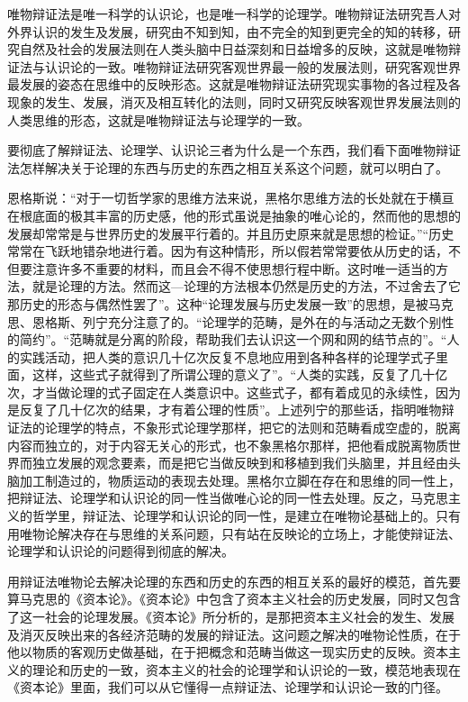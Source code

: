 唯物辩证法是唯一科学的认识论，也是唯一科学的论理学。唯物辩证法研究吾人对外界认识的发生及发展，研究由不知到知，由不完全的知到更完全的知的转移，研究自然及社会的发展法则在人类头脑中日益深刻和日益增多的反映，这就是唯物辩证法与认识论的一致。唯物辩证法研究客观世界最一般的发展法则，研究客观世界最发展的姿态在思维中的反映形态。这就是唯物辩证法研究现实事物的各过程及各现象的发生、发展，消灭及相互转化的法则，同时又研究反映客观世界发展法则的人类思维的形态，这就是唯物辩证法与论理学的一致。

要彻底了解辩证法、论理学、认识论三者为什么是一个东西，我们看下面唯物辩证法怎样解决关于论理的东西与历史的东西之相互关系这个问题，就可以明白了。

恩格斯说：“对于一切哲学家的思维方法来说，黑格尔思维方法的长处就在于横亘在根底面的极其丰富的历史感，他的形式虽说是抽象的唯心论的，然而他的思想的发展却常常是与世界历史的发展平行着的。并且历史原来就是思想的检证。”“历史常常在飞跃地错杂地进行着。因为有这种情形，所以假若常常要依从历史的话，不但要注意许多不重要的材料，而且会不得不使思想行程中断。这时唯一适当的方法，就是论理的方法。然而这—论理的方法根本仍然是历史的方法，不过舍去了它那历史的形态与偶然性罢了”。这种“论理发展与历史发展一致”的思想，是被马克思、恩格斯、列宁充分注意了的。“论理学的范畴，是外在的与活动之无数个别性的简约”。“范畴就是分离的阶段，帮助我们去认识这一个网和网的结节点的”。“人的实践活动，把人类的意识几十亿次反复不息地应用到各种各样的论理学式子里面，这样，这些式子就得到了所谓公理的意义了”。“人类的实践，反复了几十亿次，才当做论理的式子固定在人类意识中。这些式子，都有着成见的永续性，因为是反复了几十亿次的结果，才有着公理的性质”。上述列宁的那些话，指明唯物辩证法的论理学的特点，不象形式论理学那样，把它的法则和范畴看成空虚的，脱离内容而独立的，对于内容无关心的形式，也不象黑格尔那样，把他看成脱离物质世界而独立发展的观念要素，而是把它当做反映到和移植到我们头脑里，并且经由头脑加工制造过的，物质运动的表现去处理。黑格尔立脚在存在和思维的同一性上，把辩证法、论理学和认识论的同一性当做唯心论的同一性去处理。反之，马克思主义的哲学里，辩证法、论理学和认识论的同一性，是建立在唯物论基础上的。只有用唯物论解决存在与思维的关系问题，只有站在反映论的立场上，才能使辩证法、论理学和认识论的问题得到彻底的解决。

用辩证法唯物论去解决论理的东西和历史的东西的相互关系的最好的模范，首先要算马克思的《资本论》。《资本论》中包含了资本主义社会的历史发展，同时又包含了这一社会的论理发展。《资本论》所分析的，是那把资本主义社会的发生、发展及消灭反映出来的各经济范畴的发展的辩证法。这问题之解决的唯物论性质，在于他以物质的客观历史做基础，在于把概念和范畴当做这一现实历史的反映。资本主义的理论和历史的一致，资本主义的社会的论理学和认识论的一致，模范地表现在《资本论》里面，我们可以从它懂得一点辩证法、论理学和认识论一致的门径。

